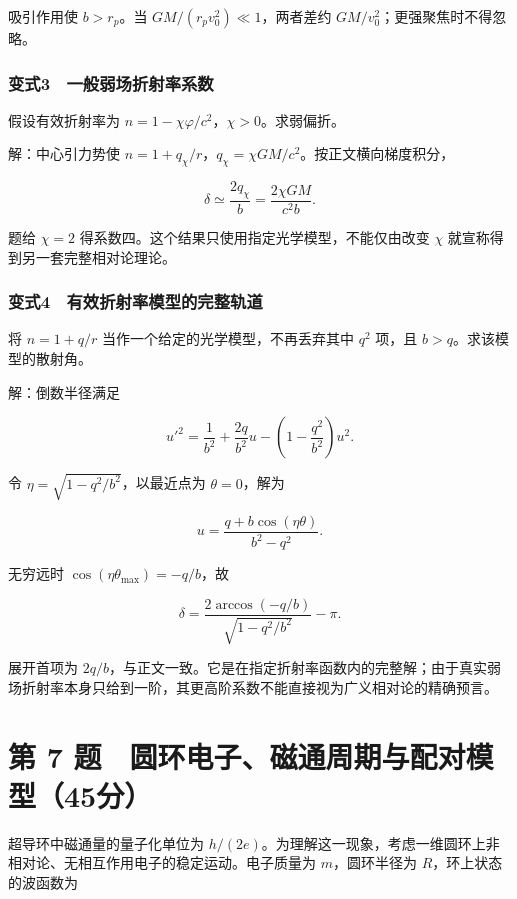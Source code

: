 \documentclass[12pt,a4paper,fontset=fandol]{ctexart}
\begin{document}
吸引作用使 \(b>r_p\)。当 \(GM/(r_pv_0^2)\ll1\)，两者差约
\(GM/v_0^2\)；更强聚焦时不得忽略。

\subsubsection{变式3　一般弱场折射率系数}\label{ux53d8ux5f0f3-ux4e00ux822cux5f31ux573aux6298ux5c04ux7387ux7cfbux6570}

假设有效折射率为 \(n=1-\chi\varphi/c^2\)，\(\chi>0\)。求弱偏折。

解：中心引力势使
\(n=1+q_\chi/r\)，\(q_\chi=\chi GM/c^2\)。按正文横向梯度积分，

\[\boxed{\delta\simeq\frac{2q_\chi}{b}
=\frac{2\chi GM}{c^2b}.}\]

题给 \(\chi=2\) 得系数四。这个结果只使用指定光学模型，不能仅由改变
\(\chi\) 就宣称得到另一套完整相对论理论。

\subsubsection{变式4　有效折射率模型的完整轨道}\label{ux53d8ux5f0f4-ux6709ux6548ux6298ux5c04ux7387ux6a21ux578bux7684ux5b8cux6574ux8f68ux9053}

将 \(n=1+q/r\) 当作一个给定的光学模型，不再丢弃其中 \(q^2\) 项，且
\(b>q\)。求该模型的散射角。

解：倒数半径满足

\[u'^2=\frac1{b^2}+\frac{2q}{b^2}u
-\left(1-\frac{q^2}{b^2}\right)u^2.\]

令 \(\eta=\sqrt{1-q^2/b^2}\)，以最近点为 \(\theta=0\)，解为

\[u=\frac{q+b\cos(\eta\theta)}{b^2-q^2}.\]

无穷远时 \(\cos(\eta\theta_{\max})=-q/b\)，故

\[\boxed{\delta=\frac{2\arccos(-q/b)}{\sqrt{1-q^2/b^2}}-\pi.}\]

展开首项为
\(2q/b\)，与正文一致。它是在指定折射率函数内的完整解；由于真实弱场折射率本身只给到一阶，其更高阶系数不能直接视为广义相对论的精确预言。

\clearpage

\section{第 7
题　圆环电子、磁通周期与配对模型（45分）}\label{ux7b2c-7-ux9898-ux5706ux73afux7535ux5b50ux78c1ux901aux5468ux671fux4e0eux914dux5bf9ux6a21ux578b45ux5206}

超导环中磁通量的量子化单位为
\(h/(2e)\)。为理解这一现象，考虑一维圆环上非相对论、无相互作用电子的稳定运动。电子质量为
\(m\)，圆环半径为 \(R\)，环上状态的波函数为
\end{document}
